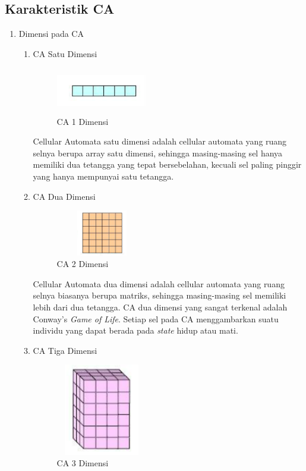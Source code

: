 \subsection{Karakteristik CA}
\begin{enumerate}
	\item Dimensi pada CA
		\begin{enumerate}
			\item CA Satu Dimensi
			
				\begin{figure} [H]
					\centering  
					\includegraphics[width=4cm, height=2cm]{CA1D} 
					\caption[CA 1 Dimensi]{CA 1 Dimensi} 
					\label{fig:CA1D} 
				\end{figure}
			
			Cellular Automata satu dimensi adalah cellular automata yang ruang selnya berupa array satu dimensi, sehingga masing-masing sel hanya memiliki dua tetangga yang tepat bersebelahan, kecuali sel paling pinggir yang hanya mempunyai satu tetangga.
			
			\item CA Dua Dimensi
			
			\begin{figure} [H]
					\centering  
					\includegraphics[width=4cm, height=2cm]{CA2D} 
					\caption[CA 2 Dimensi]{CA 2 Dimensi} 
					\label{fig:CA2D} 
				\end{figure}
			
			Cellular Automata dua dimensi adalah cellular automata yang ruang selnya biasanya berupa matriks, sehingga masing-masing sel memiliki lebih dari dua tetangga. CA dua dimensi yang sangat terkenal adalah Conway's \textit{Game of Life}. Setiap sel pada CA menggambarkan suatu individu yang dapat berada pada \textit{state} hidup atau mati.
			
			\item CA Tiga Dimensi
			
			\begin{figure} [H]
					\centering  
					\includegraphics[width=4cm, height=4cm]{CA3D} 
					\caption[CA 3 Dimensi]{CA 3 Dimensi} 
					\label{fig:CA3D} 
				\end{figure}
			

\end{enumerate}
\end{enumerate}
